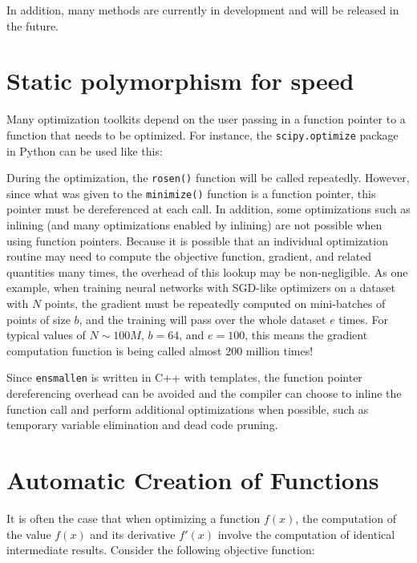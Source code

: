 \documentclass{article}
\begin{document}
In addition, many methods are currently in development and will be released in
the future.  %

\section{Static polymorphism for speed}


Many optimization toolkits depend on the user passing in a function pointer to a
function that needs to be optimized.  For instance, the {\tt scipy.optimize}
package in Python can be used like this:


During the optimization, the {\tt rosen()} function will be called repeatedly.
However, since what was given to the {\tt minimize()} function is a function
pointer, this pointer must be dereferenced at each call.  In addition, some
optimizations such as inlining (and many optimizations enabled by inlining) are
not possible when using function pointers.  Because it is possible that an
individual optimization routine may need to compute the objective function,
gradient, and related quantities many times, the overhead of this lookup may be
non-negligible.  As one example, when training neural networks with SGD-like
optimizers on a dataset with $N$ points, the gradient must be repeatedly
computed on mini-batches of points of size $b$, and the training will pass over
the whole dataset $e$ times.  For typical values of $N \sim 100M$, $b = 64$, and
$e = 100$, this means the gradient computation function is being called almost
200 million times!

Since {\tt ensmallen} is written in C++ with templates, the function pointer
dereferencing overhead can be avoided and the compiler can choose to inline the
function call and perform additional optimizations when possible, such as
temporary variable elimination and dead code pruning.

\section{Automatic Creation of Functions}

It is often the case that when optimizing a function $f(x)$, the computation of
the value $f(x)$ and its derivative $f'(x)$ involve the computation of identical
intermediate results.  Consider the following objective function:
\end{document}
